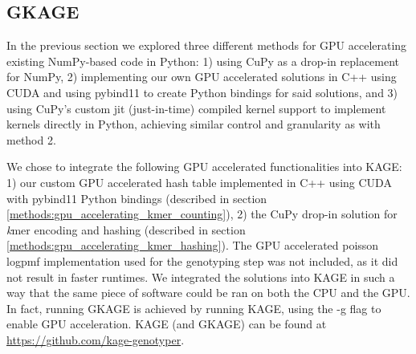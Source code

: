 \subsection{GKAGE} \label{results:gkage}
In the previous section we explored three different methods for GPU accelerating existing NumPy-based code in Python: 
1) using CuPy as a drop-in replacement for NumPy,
2) implementing our own GPU accelerated solutions in C++ using CUDA and using pybind11 to create Python bindings for said solutions, 
and 3) using CuPy's custom jit (just-in-time) compiled kernel support to implement kernels directly in Python, achieving similar control and granularity as with method 2.

We chose to integrate the following GPU accelerated functionalities into KAGE:
1) our custom GPU accelerated hash table implemented in C++ using CUDA with pybind11 Python bindings (described in section \ref{methods:gpu_accelerating_kmer_counting}),
2) the CuPy drop-in solution for \textit{k}mer encoding and hashing (described in section \ref{methods:gpu_accelerating_kmer_hashing}).
The GPU accelerated poisson logpmf implementation used for the genotyping step was not included, as it did not result in faster runtimes.
We integrated the solutions into KAGE in such a way that the same piece of software could be ran on both the CPU and the GPU.
In fact, running GKAGE is achieved by running KAGE, using the -g flag to enable GPU acceleration.
KAGE (and GKAGE) can be found at \url{https://github.com/kage-genotyper}.

